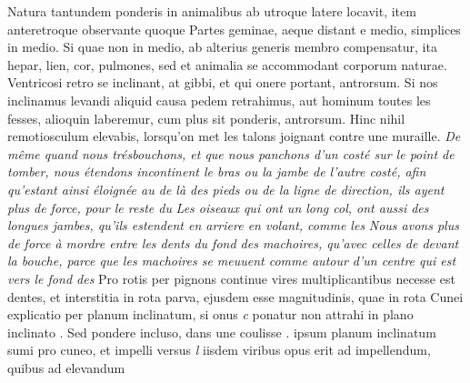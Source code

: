 \pend 
\pstart {} Natura tantundem ponderis in animalibus ab utroque latere locavit, item anteretroque observante quoque \protect{}
Partes geminae, aeque distant e medio, simplices in medio. Si quae non in medio, ab alterius generis membro compensatur, ita hepar, lien, cor, pulmones, sed et animalia se accommodant corporum naturae. Ventricosi retro se inclinant, at gibbi, et qui onere portant, antrorsum. Si nos inclinamus levandi aliquid causa pedem retrahimus, aut hominum toutes les fesses, alioquin laberemur, cum plus sit ponderis, antrorsum. Hinc nihil remotiosculum elevabis, lorsqu'on met les talons joignant contre une muraille. \textit{De même quand nous tr\'{e}sbouchons, et que nous panchons d'un cost\'{e} sur le point de tomber, nous \'{e}tendons incontinent le bras ou la jambe de l'autre cost\'{e}, afin qu'estant ainsi \'{e}loign\'{e}e au de l\`{a} des pieds ou de la ligne de direction, ils ayent plus de force, pour  le reste du }
\textit{Les oiseaux qui ont un long col, ont aussi des longues jambes, qu'ils estendent en arriere en volant, comme les}  
\pend 
\pstart
{} \textit{Nous avons plus de force \`{a} mordre entre les dents du fond des machoires, qu'avec celles de devant la bouche, parce que les machoires se meuuent comme autour d'un centre qui est vers le fond des}  
\pend 
\pstart 
{} Pro rotis per pignons continue vires multiplicantibus necesse est dentes, et interstitia in rota parva, ejusdem esse magnitudinis, quae in rota  
\pend
\pstart {}Cunei explicatio per planum inclinatum, si onus \textit{c} ponatur non attrahi in plano inclinato . Sed pondere incluso, dans une coulisse . ipsum planum inclinatum  sumi pro cuneo, et impelli versus \textit{l} iisdem viribus opus erit ad impellendum, quibus ad elevandum  
